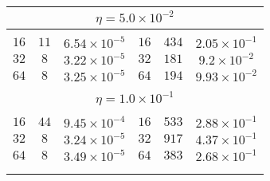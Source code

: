 \begin{table}[]
\begin{center}
\begin{tabular}{@{}ccc|ccc@{}}
\multicolumn{6}{c}{$\eta = 5.0\times 10^{-2}$} \\[5pt]
\hline\\[-11pt]
$16$ & $11$ & $6.54\times 10^{-5}$ & $16$ & $434$ & $2.05\times 10^{-1}$ \\ [1pt]
$32$ & $8$ & $3.22\times 10^{-5}$  & $32$ & $181$ & $9.2\times 10^{-2}$  \\ [1pt]
$64$ & $8$ & $3.25\times 10^{-5}$  & $64$ & $194$ & $9.93\times 10^{-2}$ \\ [1pt]
\hline\\[-11pt]

\multicolumn{6}{c}{$\eta = 1.0\times 10^{-1}$} \\[5pt]
\hline\\[-11pt]
$16$ & $44$ & $9.45\times 10^{-4}$ & $16$ & $533$ & $2.88\times 10^{-1}$ \\ [1pt]
$32$ & $8$ & $3.24\times 10^{-5}$  & $32$ & $917$ & $4.37\times 10^{-1}$ \\ [1pt]
$64$ & $8$ & $3.49\times 10^{-5}$  & $64$ & $383$ & $2.68\times 10^{-1}$ \\ [1pt]
\hline\\[-11pt]


\hline\\[-8pt]
\end{tabular}\\[5pt]
\end{center}
\normalsize
\end{table}


